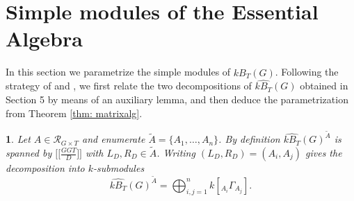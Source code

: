 \documentclass[12pt]{article}
\theoremstyle{change}
\newtheorem{nothing}[theorem]{}
\newcommand{\calR}{\mathcal{R}}
\newcommand{\1}{{\bf 1}}
\begin{document}

\section{Simple modules of the Essential Algebra}


In this section we parametrize the simple modules of $\widehat{kB_T}(G)$. Following the strategy of \cite[Section 9]{BC} and \cite[Section 4]{CM}, we first relate the two decompositions of $\widehat{kB_T}(G)$ obtained in Section 5 by means of an auxiliary lemma, and then deduce the parametrization from Theorem \ref{thm: matrixalg}.

\begin{nothing}
Let $A\in\calR_{G\times T}$ and enumerate $\widetilde{A}=\{A_1,\dots,A_n\}$. By definition $\widehat{kB_T}(G)^{\widetilde{A}}$ is spanned by $\big[\big[\tfrac{GGT}{D}\big]\big]$ with
$L_D,R_D\in\widetilde{A}$. Writing $(L_D,R_D)=(A_i,A_j)$ gives the decomposition into $k$-submodules
\begin{equation}\label{eq: directsum}
  \widehat{kB_T}(G)^{\widetilde{A}}=\bigoplus_{i,j=1}^{n}k[{}_{A_i}\Gamma_{A_j}].
\end{equation}
\end{nothing}
\end{document}
